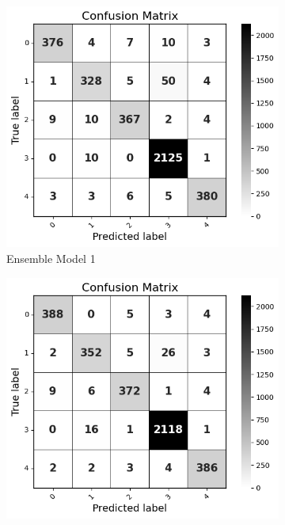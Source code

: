 \begin{figure}[H]
    \centering
    \begin{subfigure}[b]{0.49\textwidth}
        \centering
        \includegraphics[width=\textwidth]{Images/EM CM.png}
        \caption{Ensemble Model 1}
        \label{dfdl3123}  %
    \end{subfigure}
    \hfill
    \vspace{0.25cm}
    \begin{subfigure}[b]{0.49\textwidth}
        \centering
        \includegraphics[width=\textwidth]{Images/EM2 CM.png}

\end{subfigure}
\end{figure}
